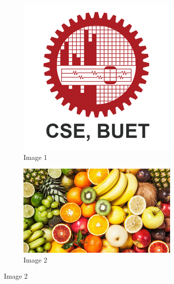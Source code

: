 \documentclass{article}
\begin{document}
\begin{figure}[h]
    \centering
    \begin{subfigure}[b]{0.4\textwidth}
        \includegraphics[width=\textwidth]{CSE_BUET.png}
        \caption{Image 1}
    \end{subfigure}
    \hfill
    \begin{subfigure}[b]{0.55\textwidth}
        \includegraphics[width=\textwidth]{Fruits.png}
        \caption{Image 2}
    \end{subfigure}
    
    \vspace{1em}
    

\end{figure}
\end{document}
